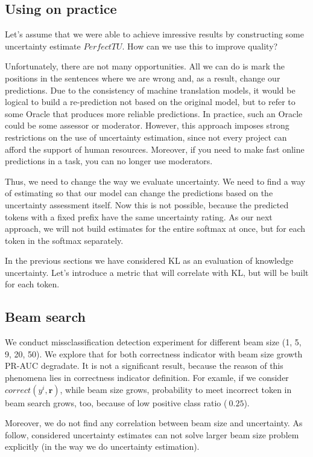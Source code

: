 \documentclass[a4paper,14pt]{extarticle}
\begin{document}
\subsection{Using on practice}
	Let's assume that we were able to achieve imressive results by constructing some uncertainty estimate $PerfectTU$. How can we use this to improve quality?

	Unfortunately, there are not many opportunities. All we can do is mark the positions in the sentences where we are wrong and, as a result, change our predictions. Due to the consistency of machine translation models, it would be logical to build a re-prediction not based on the original model, but to refer to some Oracle that produces more reliable predictions. In practice, such an Oracle could be some assessor or moderator. However, this approach imposes strong restrictions on the use of uncertainty estimation, since not every project can afford the support of human resources. Moreover, if you need to make fast online predictions in a task, you can no longer use moderators.

	Thus, we need to change the way we evaluate uncertainty. We need to find a way of estimating so that our model can change the predictions based on the uncertainty assessment itself. Now this is not possible, because the predicted tokens with a fixed prefix have the same uncertainty rating. As our next approach, we will not build estimates for the entire softmax at once, but for each token in the softmax separately.

	In the previous sections we have considered KL as an evaluation of knowledge uncertainty. Let's introduce a metric that will correlate with KL, but will be built for each token.
	
\subsection{Beam search}
	We conduct missclassification detection experiment for different beam size (1, 5, 9, 20, 50). We explore that for both correctness indicator with beam size growth PR-AUC degradate. It is not a significant result, because the reason of this phenomena lies in correctness indicator definition. For examle, if we consider $correct(y^i, \textbf{r})$, while beam size grows, probability to meet incorrect token in beam search grows, too, because of low positive class ratio ($~0.25$).
	
	Moreover, we do not find any correlation between beam size and uncertainty. As follow, considered uncertainty estimates can not solve larger beam size problem explicitly (in the way we do uncertainty estimation).
\end{document}
